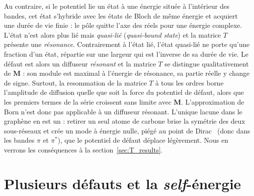 Au contraire, si le potentiel lie un état à une énergie située à l'intérieur des bandes, cet état s'hybride avec les états de Bloch de même énergie et acquiert une durée de vie finie : le pôle quitte l'axe des réels pour une énergie complexe. L'état n'est alors plus lié mais \textit{quasi-lié} (\textit{quasi-bound state}) et la matrice $T$ présente une \textit{résonance}. Contrairement à l'état lié, l'état quasi-lié ne porte qu'une fraction d'un état, répartie sur une largeur qui est l'inverse de sa durée de vie. Le défaut est alors un diffuseur \textit{résonant} et la matrice $T$ se distingue qualitativement de $\bm M$ : son module est maximal à l'énergie de résonance, sa partie réelle y change de signe. Surtout, la resommation de la matrice $T$ à tous les ordres borne l'amplitude de diffusion quelle que soit la force du potentiel de défaut, alors que les premiers termes de la série croissent sans limite avec $\bm M$. L'approximation de Born n'est donc pas applicable à un diffuseur résonant. L'unique lacune dans le graphène en est un : retirer un seul atome de carbone brise la symétrie des deux sous-réseaux et crée un mode à énergie nulle, piégé au point de Dirac~\cite{pereiraDisorderInducedLocalized2006} (donc dans les bandes $\pi$ et $\pi^*$), que le potentiel de défaut déplace légèrement. Nous en verrons les conséquences à la section~\ref{sec:T_results}.

\section{Plusieurs défauts et la \textit{self}-énergie}\label{sec:mbt_sigma}

